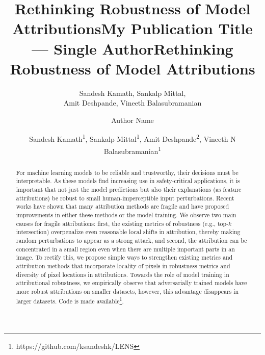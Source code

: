 \documentclass[letterpaper]{article} %
\title{Rethinking Robustness of Model Attributions}
\author{
    Sandesh Kamath,
    Sankalp Mittal,\\
    Amit Deshpande,
    Vineeth Balasubramanian
}
\title{My Publication Title --- Single Author}
\author {
    Author Name
}
\title{Rethinking Robustness of Model Attributions}
\author {
    Sandesh Kamath\textsuperscript{\rm 1},
    Sankalp Mittal\textsuperscript{\rm 1},
    Amit Deshpande\textsuperscript{\rm 2},
    Vineeth N Balasubramanian\textsuperscript{\rm 1}
}
\begin{document}
\maketitle

\begin{abstract}
For machine learning models to be reliable and trustworthy, their decisions must be interpretable. As these models find increasing use in safety-critical applications, it is important that not just the model predictions but also their explanations (as feature attributions) be robust to small human-imperceptible input perturbations. Recent works have shown that many attribution methods are fragile and have proposed improvements in either these methods or the model training. We observe two main causes for fragile attributions: first, the existing metrics of robustness (e.g., top-$k$ intersection) overpenalize even reasonable local shifts in attribution, thereby making random perturbations to appear as a strong attack, and second, the attribution can be concentrated in a small region even when there are multiple important parts in an image. To rectify this, we propose simple ways to strengthen existing metrics and attribution methods that incorporate locality of pixels in robustness metrics and diversity of pixel locations in attributions. Towards the role of model training in attributional robustness, we empirically observe that adversarially trained models have more robust attributions on smaller datasets, however, this advantage disappears in larger datasets. Code is made available\footnote{https://github.com/ksandeshk/LENS}.

\end{abstract}
\end{document}
